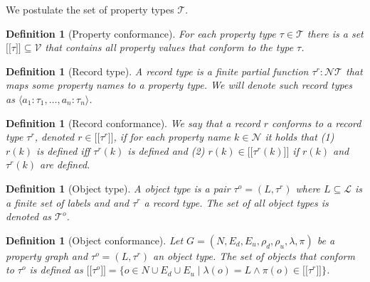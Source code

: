 \documentclass[a4paper]{article}
\makeatletter
\newtheorem{definition}[theorem]{Definition}
\newcommand{\pto}{}%
\DeclareRobustCommand{\pto}{\mathrel{\mathpalette\p@to@gets\to}}
\newcommand{\p@to@gets}[2]{%
  \ooalign{\hidewidth$\m@th#1\mapstochar\mkern5mu$\hidewidth\cr$\m@th#1\to$\cr}%
}
\newcommand{\ptype}{\tau}
\newcommand{\ptypes}{\mathcal{T}}
\newcommand{\rtype}{\tau^r}
\newcommand{\otype}{\tau^o}
\newcommand{\otypes}{\mathcal{T}^o}
\newcommand{\lsem}{\ensuremath{[\![}}
\newcommand{\rsem}{\ensuremath{]\!]}}
\newcommand{\sem}[1]{\ensuremath{\lsem #1 \rsem}}
\makeatother
\begin{document}
We postulate the set of property types $\mathcal{T}$.

\begin{definition}[Property conformance]
  For each property type $\ptype \in \ptypes$ there is a set $\sem{\ptype} \subseteq \mathcal{V}$ that contains all property values that \emph{conform} to the type $\ptype$.
\end{definition}

\begin{definition}[Record type]
  A \emph{record type} is a finite partial function $\rtype : \mathcal{N} \pto \ptypes$ that maps some property names to a property type.
  We will denote such record types as $\langle a_1 : \ptype_1, \ldots, a_n : \ptype_n \rangle$.
\end{definition}

\begin{definition}[Record conformance]
  We say that a record $r$ \emph{conforms} to a record type $\rtype$, denoted $r \in \sem{\rtype}$, if for each property name $k \in \mathcal{N}$ it holds that (1) $r(k)$ is defined iff $\rtype(k)$ is defined and (2) $r(k) \in \sem{\rtype(k)}$ if $r(k)$ and $\rtype(k)$ are defined.
\end{definition}

\begin{definition}[Object type]
  A \emph{object type} is a pair $\otype = (L, \rtype)$ where $L \subseteq \mathcal{L}$ is a finite set of labels and and $\rtype$ a record type. 
  The set of all object types is denoted as $\otypes$.
\end{definition}

\begin{definition}[Object conformance]
  Let $G = (N, E_d, E_u, \rho_d, \rho_u, \lambda, \pi)$ be a property graph and $\otype = (L, \rtype)$ an object type. The set of objects that \emph{conform} to $\otype$ is defined as $\sem{\otype} = \{o \in N \cup E_d \cup E_u \mid \lambda(o) = L \wedge \pi(o) \in \sem{\rtype}\}$.
\end{definition}
\end{document}
